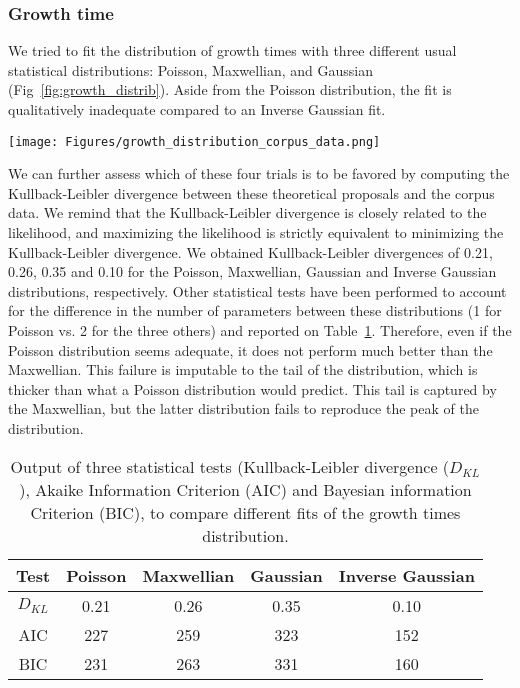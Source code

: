 \documentclass[12pt,twocolumn,amsmath,amssymb,aps,longbibliography]{revtex4-1}  %
\begin{document}
\subsubsection{Growth time}

We tried to fit the distribution of growth times with three different usual statistical distributions: Poisson, Maxwellian, and Gaussian (Fig~\ref{fig:growth_distrib}). Aside from the Poisson distribution, the fit is qualitatively inadequate compared to an Inverse Gaussian fit. 

\begin{figure*}[!tp]
  \centering
  \texttt{[image: Figures/growth\_distribution\_corpus\_data.png]}
  \caption{Several fits of the distribution of growth times as extracted from corpus data.}
  \label{fig:growth_distrib}
\end{figure*}

We can further assess which of these four trials is to be favored by computing the Kullback-Leibler divergence between these theoretical proposals and the corpus data. We remind that the Kullback-Leibler divergence is closely related to the likelihood, and maximizing the likelihood is strictly equivalent to minimizing the Kullback-Leibler divergence. We obtained Kullback-Leibler divergences of 0.21, 0.26, 0.35 and 0.10 for the Poisson, Maxwellian, Gaussian and Inverse Gaussian distributions, respectively. Other statistical tests have been performed to account for the difference in the number of parameters between these distributions (1 for Poisson vs. 2 for the three others) and reported on Table~\ref{table:growth_test}.  Therefore, even if the Poisson distribution seems adequate, it does not perform much better than the Maxwellian. This failure is imputable to the tail of the distribution, which is thicker than what a Poisson distribution would predict. This tail is captured by the Maxwellian, but the latter distribution fails to reproduce the peak of the distribution.

\begin{table}
\centering
\caption{Output of three statistical tests (Kullback-Leibler divergence ($D_{KL}$), Akaike Information Criterion (AIC) and Bayesian information Criterion (BIC), to compare different fits of the growth times distribution.}
\label{table:growth_test}
\begin{tabular}{|c|c|c|c|c|}
\hline
Test & Poisson & Maxwellian & Gaussian & Inverse Gaussian \\ \hline
$D_{KL}$ & 0.21 & 0.26 & 0.35 & 0.10 \\ \hline
AIC & 227  & 259 & 323 & 152 \\ \hline
BIC & 231 & 263 & 331 & 160 \\ \hline
\end{tabular}
\end{table}
\end{document}
